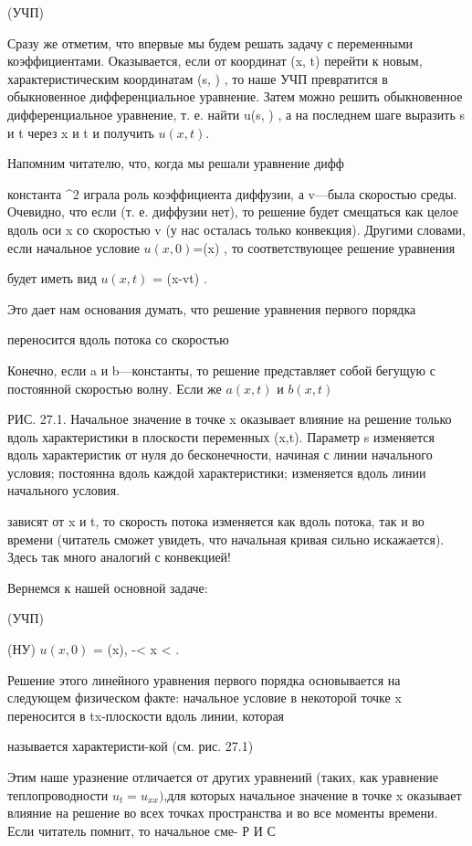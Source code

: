 \documentclass[
  ukrainian,
]{article}
\begin{document}
(УЧП)

Сразу же отметим, что впервые мы будем решать задачу с переменными
коэффициентами. Оказывается, если от координат (x, t) перейти к новым,
характеристическим координатам (s, \tau) , то наше УЧП превратится в
обыкновенное дифференциальное уравнение. Затем можно решить обыкновенное
дифференциальное уравнение, т. е. найти u(s, \tau) , а на последнем шаге
выразить s и t через x и t и получить \(u(x, t)\).

Напомним читателю, что, когда мы решали уравнение дифф

константа \alpha\^{}2 играла роль коэффициента диффузии, а v---была
скоростью среды. Очевидно, что если  (т. е. диффузии нет), то
решение будет смещаться как целое вдоль оси x со скоростью v (у нас
осталась только конвекция). Другими словами, если начальное условие
\(u(x,0)\)=\varphi(x) , то соответствующее решение уравнения

будет иметь вид \(u(x, t)\) = \varphi(x-vt) .

Это дает нам основания думать, что решение уравнения первого порядка

переносится вдоль потока со скоростью

Конечно, если a и b---константы, то решение представляет собой бегущую с
постоянной скоростью волну. Если же \(a(x, t)\) и \(b(x, t)\)

РИС. 27.1. Начальное значение в точке x оказывает влияние на решение
только вдоль характеристики в плоскости переменных (x,t). Параметр s
изменяется вдоль характеристик от нуля до бесконечности, начиная с линии
начального условия; \tau   постоянна вдоль каждой характеристики;
\tau   изменяется вдоль линии начального условия.

зависят от x и t, то скорость потока изменяется как вдоль потока, так и
во времени (читатель сможет увидеть, что начальная кривая сильно
искажается). Здесь так много аналогий с конвекцией!

Вернемся к нашей основной задаче:

(УЧП)

(НУ) \(u(x, 0)\) = \varphi(x), -\infty \textless{} x \textless{} \infty.

Решение этого линейного уравнения первого порядка основывается на
следующем физическом факте: начальное условие в некоторой точке x
переносится в tx-плоскости вдоль линии, которая

называется характеристи-кой (см. рис. 27.1)

Этим наше уразнение отличается от других уравнений (таких, как уравнение
теплопроводности \(u_t = u_{xx} )\),для которых начальное значение в
точке x оказывает влияние на решение во всех точках пространства и во
все моменты времени. Если читатель помнит, то начальное сме- Р И С
\end{document}
